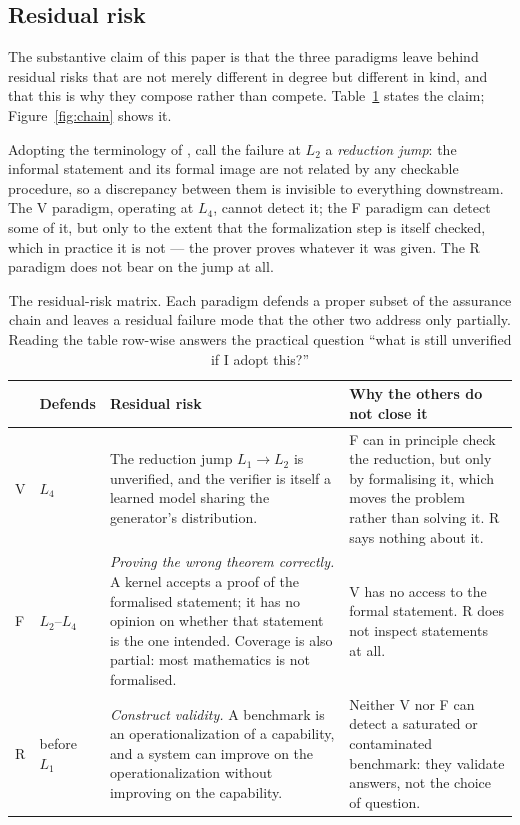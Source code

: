\documentclass[11pt,a4paper]{article}
\newcommand{\paradigmV}{\textsf{V}}
\newcommand{\paradigmF}{\textsf{F}}
\newcommand{\paradigmR}{\textsf{R}}
\begin{document}
\subsection{Residual risk}

The substantive claim of this paper is that the three paradigms leave behind
residual risks that are not merely different in degree but different in kind,
and that this is why they compose rather than compete. Table~\ref{tab:matrix}
states the claim; Figure~\ref{fig:chain} shows it.

Adopting the terminology of \citet{chen2026lectures}, call the failure at
$L_2$ a \emph{reduction jump}: the informal statement and its formal image are
not related by any checkable procedure, so a discrepancy between them is
invisible to everything downstream. The \paradigmV{} paradigm, operating at
$L_4$, cannot detect it; the \paradigmF{} paradigm can detect some of it, but
only to the extent that the formalization step is itself checked, which in
practice it is not --- the prover proves whatever it was given. The
\paradigmR{} paradigm does not bear on the jump at all.

\begin{table}[t]
\centering
\caption{The residual-risk matrix. Each paradigm defends a proper subset of the
assurance chain and leaves a residual failure mode that the other two address
only partially. Reading the table row-wise answers the practical question
``what is still unverified if I adopt this?''}
\label{tab:matrix}
\small
\begin{tabularx}{\textwidth}{@{}l l X X@{}}
\toprule
 & \textbf{Defends} & \textbf{Residual risk} & \textbf{Why the others do not close it} \\
\midrule
\paradigmV{} & $L_4$ &
The reduction jump $L_1\!\to\!L_2$ is unverified, and the verifier is itself a
learned model sharing the generator's distribution. &
\paradigmF{} can in principle check the reduction, but only by formalising it,
which moves the problem rather than solving it. \paradigmR{} says nothing about
it. \\
\addlinespace
\paradigmF{} & $L_2$--$L_4$ &
\emph{Proving the wrong theorem correctly.} A kernel accepts a proof of the
formalised statement; it has no opinion on whether that statement is the one
intended. Coverage is also partial: most mathematics is not formalised. &
\paradigmV{} has no access to the formal statement. \paradigmR{} does not
inspect statements at all. \\
\addlinespace
\paradigmR{} & before $L_1$ &
\emph{Construct validity.} A benchmark is an operationalization of a
capability, and a system can improve on the operationalization without
improving on the capability. &
Neither \paradigmV{} nor \paradigmF{} can detect a saturated or contaminated
benchmark: they validate answers, not the choice of question. \\
\bottomrule
\end{tabularx}
\end{table}
\end{document}

